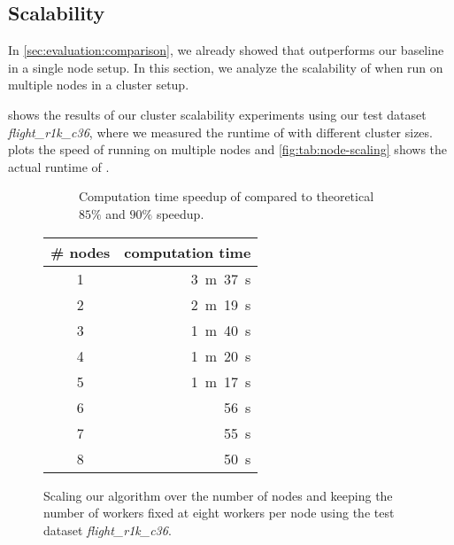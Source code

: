 \subsection{Scalability}\label{sec:evaluation:scalability}

  In \cref{sec:evaluation:comparison}, we already showed that \dodo{} outperforms our baseline \ocddiscover{} in a single node setup.
  In this section, we analyze the scalability of \dodo{} when run on multiple nodes in a cluster setup.

   shows the results of our cluster scalability experiments using our test dataset \textit{flight\_r1k\_c36}, where we measured the runtime of \dodo{} with different cluster sizes.
   plots the speed of running \dodo{} on multiple nodes and \cref{fig:tab:node-scaling} shows the actual runtime of \dodo{}.

  \begin{figure}[htbp]
    \centering
    \begin{subfigure}[c]{0.6\textwidth}
      \centering
      
      \caption{Computation time speedup of \dodo{} compared to theoretical $85 \%$ and $90 \%$ speedup.}
      \label{fig:fig:node-scaling}
    \end{subfigure}
    \begin{subtable}[c]{0.39\textwidth}
      \centering
      \begin{tabular}{cr}
        \toprule
        \textbf{\# nodes} & \textbf{computation time} \\
        \midrule
        1 & 3~m~37~s \\
        2 & 2~m~19~s \\
        3 & 1~m~40~s \\
        4 & 1~m~20~s \\
        5 & 1~m~17~s \\
        6 & 56~s \\
        7 & 55~s \\
        8 & 50~s \\
        \bottomrule
      \end{tabular}
      \caption{Computation time for finding all \glspl{od} in the dataset of different cluster sizes.}
      \label{fig:tab:node-scaling}
    \end{subtable}
    \caption{Scaling our algorithm over the number of nodes and keeping the number of workers fixed at eight workers per node using the test dataset \textit{flight\_r1k\_c36}.}
    \label{fig:node-scaling}
  \end{figure}

